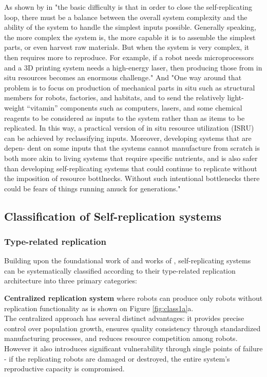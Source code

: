 As shown by \citeauthor{Chirikjian2022Entropy} in  \cite{Chirikjian2022Entropy}
"the basic difficulty is that in order to close the self-replicating loop, there
must be a balance between the overall system complexity and the ability of the
system to handle the simplest inputs possible. Generally speaking, the more
complex the system is, the more capable it is to assemble the simplest parts,
or even harvest raw materials. But when the system is very complex, it then
requires more to reproduce. For example, if a robot needs microprocessors and
a 3D printing system needs a high-energy laser, then producing those from in
situ resources becomes an enormous challenge."
And "One way around that problem is to focus on production of mechanical parts in situ such as structural members 
for robots, factories, and habitats, and to send the relatively light-weight
“vitamin” components such as computers, lasers, and some chemical reagents 
to be considered as inputs to the system rather than as items to be replicated.
In this way, a practical version of in situ resource utilization (ISRU) can be
achieved by reclassifying inputs. Moreover, developing systems that are depen-
dent on some inputs that the systems cannot manufacture from scratch is both
more akin to living systems that require specific nutrients, and is also safer than
developing self-replicating systems that could continue to replicate without the
imposition of resource bottlnecks. Without such intentional bottlenecks there
could be fears of things running amuck for generations."



\subsection{Classification of Self-replication systems}
 
\subsubsection{Type-related replication} 
Building upon the foundational work of \citeauthor{Jones2021Thesis} \cite{Jones2021Thesis} and  
works of \citeauthor{Lee2007Robotic} , 
self-replicating systems can be 
systematically classified according to their type-related replication architecture into three primary categories:

\textbf{Centralized replication system } where robots can produce only robots 
without replication functionality  as is shown on Figure \ref{fig:class1a}a.\\
The centralized approach has several distinct advantages: it provides precise control 
over population growth, ensures quality consistency through standardized 
manufacturing processes, and reduces resource competition among robots.
However it also introduces significant vulnerability through single 
points of failure - if the replicating robots are damaged or destroyed, 
the entire system's reproductive capacity is compromised. 

